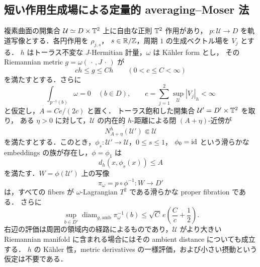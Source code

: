 \subsection{短い作用生成場による定量的 averaging--Moser 法}

\begin{theorem}
\label{ke:short-torus-averaging}
複素曲面の開集合 $\mathcal U\simeq D\times\mathbb T^2$ 上に自由な正則 $\mathbb T^2$ 作用があり，
$p:\mathcal U\to D$ を軌道写像とする．各円作用を $\rho_{j,s}$，
$s\in\mathbb R/\mathbb Z$，周期 $1$ の生成ベクトル場を $V_j$ とする．
$h$ はトーラス不変な $J$-Hermitian 計量，$\omega$ は Kähler form とし，
その Riemannian metric $g=\omega(\,\cdot\,,J\,\cdot\,)$ が
\begin{equation}\label{ke:eq:coarse-tensor-bound}
 c h\le g\le C h\qquad(0<c\le C<\infty)
\end{equation}
を満たすとする．さらに
\[
 \int_{p^{-1}(b)}\omega=0\quad(b\in D),\qquad
 e=\sum_{j=1}^2\sup_{\mathcal U}|V_j|_h<\infty
\]
と仮定し，$A=Ce/(2c)$ と置く．
トーラス飽和した開集合 $\mathcal U'=D'\times\mathbb T^2$ を取り，
ある $\eta>0$ に対して，$\mathcal U$ の内在的 $h$-距離による閉 $(A+\eta)$-近傍が
\begin{equation}\label{ke:eq:moser-buffer}
 \overline{N_{A+\eta}^{h}(\mathcal U')}\Subset\mathcal U
\end{equation}
を満たすとする．このとき，$\phi_s:\mathcal U'\to\mathcal U$，$0\le s\le1$，
$\phi_0=\operatorname{id}$ という滑らかな embeddings の族が存在し，$\phi=\phi_1$ は
\begin{equation}\label{ke:eq:moser-displacement}
 d_h(x,\phi_s(x))\le A
\end{equation}
を満たす．$W=\phi(\mathcal U')$ 上の写像
\[
 \pi_\omega=p\circ\phi^{-1}:W\longrightarrow D'
\]
は，すべての fibers が $\omega$-Lagrangian $T^2$ である滑らかな proper fibration である．
さらに
\begin{equation}\label{ke:eq:ambient-fiber-bound}
 \sup_{b\in D'}\operatorname{diam}_{g,\mathrm{amb}}\pi_\omega^{-1}(b)
 \le \sqrt C\,e\left(\frac Cc+\frac12\right).
\end{equation}
右辺の評価は周囲の領域内の経路によるものであり，$\mathcal U$ がより大きい
Riemannian manifold に含まれる場合にはその ambient distance についても成立する．
$h$ の Kähler 性，metric derivatives の一様評価，および小さい摂動という仮定は不要である．
\end{theorem}
